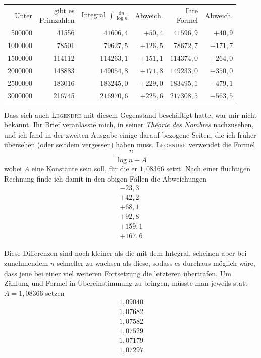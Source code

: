 \begin{center}
\begingroup\fontsize{10}{11.5}\selectfont\setlength{\tabcolsep}{3pt}
\begin{tabular}{r|r|rr|rr}
Unter & \shortstack{gibt es\\Primzahlen} & \shortstack{Integral\\$\displaystyle\int\frac{\mathrm{d}n}{\log n}$} & Abweich. & \shortstack{Ihre\\Formel} & Abweich. \\
500000 & 41556 & $41606{,}4$ & $+50{,}4$ & $41596{,}9$ & $+40{,}9$ \\
1000000 & 78501 & $79627{,}5$ & $+126{,}5$ & $78672{,}7$ & $+171{,}7$ \\
1500000 & 114112 & $114263{,}1$ & $+151{,}1$ & $114374{,}0$ & $+264{,}0$ \\
2000000 & 148883 & $149054{,}8$ & $+171{,}8$ & $149233{,}0$ & $+350{,}0$ \\
2500000 & 183016 & $183245{,}0$ & $+229{,}0$ & $183495{,}1$ & $+479{,}1$ \\
3000000 & 216745 & $216970{,}6$ & $+225{,}6$ & $217308{,}5$ & $+563{,}5$
\end{tabular}\endgroup
\end{center}

Dass sich auch \textsc{Legendre} mit diesem Gegenstand beschäftigt hatte, war mir nicht bekannt. Ihr Brief veranlasste mich, in seiner \textit{Théorie des Nombres} nachzusehen, und ich fand in der zweiten Ausgabe einige darauf bezogene Seiten, die ich früher übersehen (oder seitdem vergessen) haben muss. \textsc{Legendre} verwendet die Formel
\[
\frac{n}{\log n-A}
\]
wobei $A$ eine Konstante sein soll, für die er $1{,}08366$ setzt. Nach einer flüchtigen Rechnung finde ich damit in den obigen Fällen die Abweichungen
\[
\begin{array}{r}
-23{,}3\\
+42{,}2\\
+68{,}1\\
+92{,}8\\
+159{,}1\\
+167{,}6
\end{array}
\]

Diese Differenzen sind noch kleiner als die mit dem Integral, scheinen aber bei zunehmendem $n$ schneller zu wachsen als diese, sodass es durchaus möglich
%
wäre, dass jene bei einer viel weiteren Fortsetzung die letzteren überträfen. Um Zählung und Formel in Übereinstimmung zu bringen, müsste man jeweils statt $A=1{,}08366$ setzen
\[
\begin{array}{r}
1{,}09040\\
1{,}07682\\
1{,}07582\\
1{,}07529\\
1{,}07179\\
1{,}07297
\end{array}
\]

